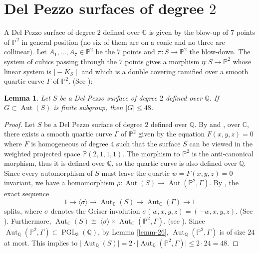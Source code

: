 \documentclass[leqno,12pt]{amsart} %
\newtheorem{lem}[thm]{Lemma}
\newcommand{\Q}{\ensuremath{\mathbb{Q} }}
\newcommand{\C}{\ensuremath{\mathbb{C} }}
\newcommand{\p}{\ensuremath{\mathbb{P} }}
\DeclareMathOperator{\PGL}{PGL}
\DeclareMathOperator{\Aut}{Aut}
\begin{document}
  \section{\texorpdfstring{Del Pezzo surfaces of degree $2$}{Del Pezzo surfaces of degree 2}}
A Del Pezzo surface of degree $2$ defined over $\C $ is given by the blow-up of $7$ points of $\p^2$ in general position (no six of them are on a conic and no three are collinear). Let $A_1, \ldots , A_7 \in\p^2$ be the $7$ points and $\pi:S\rightarrow \p^2$ the blow-down. The system of cubics passing through the $7$ points gives a morphism $\eta:S\rightarrow \p^2$ whose linear system is $\mid - K_S\mid $ and which is a double covering ramified over a smooth quartic curve $\Gamma$ of $\p^2$. (See \cite{MR1802909, MR2066103, MR2641179}):
\begin{center}
\end{center}
\begin{lem}\label{lemm-22}
    Let $S$ be a Del Pezzo surface of degree $2$ defined over $\Q $. If $G\subset\Aut(S)$ is finite subgroup, then $\mid G\mid \le 48$. 
\end{lem}
 
\begin{proof}
    Let $S$ be a Del Pezzo surface of degree $2$ defined over $\Q $. By \cite[Theorem III.3.5]{MR1440180} and \cite[Corollary 3.54]{MR2062787}, over $\C $, there exists a smooth quartic curve $\Gamma$ of $\p^2$ given by the equation $F(x,y,z)=0$ where $F$ is homogeneous of degree $4$ such that the surface $S$ can be viewed in the weighted projected space $\p(2,1,1,1)$. The morphism to $\p^2$ is the anti-canonical morphism, thus it is defined over $\Q $, so the quartic curve is also defined over $\Q $. Since every automorphism of $S$ must leave the quartic $w=F(x,y,z)=0$ invariant, we have a homomorphism $\rho: \Aut(S)\rightarrow \Aut(\p^2,\Gamma)$. By \cite[Proposition 8.3.1]{MR2286582}, the exact sequence 
    \begin{equation}\label{Exact:deg2}
    1\rightarrow\langle\sigma\rangle\rightarrow \Aut_{\C }(S)\rightarrow \Aut_{\C }(\Gamma)\rightarrow 1
\end{equation}
splits, where $\sigma$ denotes the Geiser involution $\sigma(w,x,y,z)=(-w,x,y,z)$. (See \cite[Lemma 8.3.2]{MR2286582}). Furthermore, $\Aut_{\C }(S)\cong~\langle\sigma\rangle\times\Aut_{\C }(\p^2,\Gamma)$. (see \cite[Proposition 8.3.1]{MR2286582}). Since $\Aut_{\Q }(\p^2,\Gamma)\subset \PGL _3(\Q )$, by Lemma \ref{lemm-26}, $\Aut_{\Q }(\p^2,\Gamma)$ is of size $24$ at most. This implies to $\mid \Aut_{\Q }(S)\mid =2\cdot\mid \Aut_{\Q }(\p^2,\Gamma)\mid \le 2\cdot24=48$.
\end{proof}
 
\end{document}
